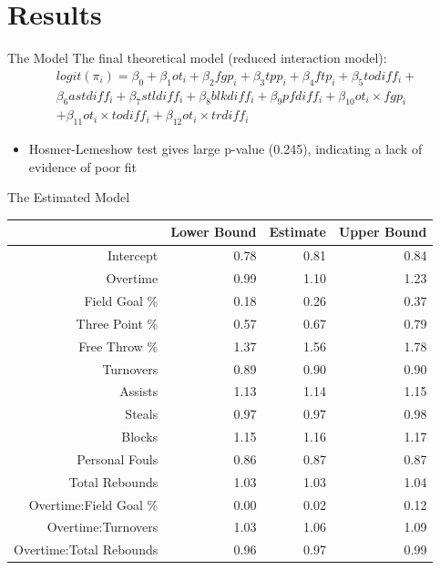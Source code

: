 \documentclass{beamer}
\begin{document}
\section{Results}

	\begin{frame}{The Model}
	The final theoretical model (reduced interaction model): 
	\begin{multline*}
	logit(\pi_{i})=\beta_{0}+\beta_{1}ot_{i}+\beta_{2}fgp_{i}+\beta_{3}tpp_{i}+\beta_{4}ftp_{i}+\beta_{5}todiff_{i}+\\
	\beta_{6}astdiff_{i}+\beta_{7}stldiff_{i}+\beta_{8}blkdiff_{i}+\beta_{9}pfdiff_{i}+\beta_{10}ot_{i}\times fgp_{i}\\
	+\beta_{11}ot_{i}\times todiff_{i}+\beta_{12}ot_{i}\times trdiff_{i}
	\end{multline*}
\begin{itemize}
	\item Hosmer-Lemeshow test gives large p-value (0.245), indicating a lack of evidence of poor fit
\end{itemize}	
\end{frame}	

\begin{frame}{The Estimated Model}
\begin{table}[ht]
	\centering
	\begin{tabular}{rrrr}
		\hline
		& Lower Bound & Estimate & Upper Bound \\ 
		\hline
		Intercept & 0.78 & 0.81 & 0.84 \\ 
		Overtime & 0.99 & 1.10 & 1.23 \\ 
		Field Goal \% & 0.18 & 0.26 & 0.37 \\ 
		Three Point \% & 0.57 & 0.67 & 0.79 \\ 
		Free Throw \% & 1.37 & 1.56 & 1.78 \\ 
		Turnovers & 0.89 & 0.90 & 0.90 \\ 
		Assists & 1.13 & 1.14 & 1.15 \\ 
		Steals & 0.97 & 0.97 & 0.98 \\ 
		Blocks & 1.15 & 1.16 & 1.17 \\ 
		Personal Fouls & 0.86 & 0.87 & 0.87 \\ 
		Total Rebounds & 1.03 & 1.03 & 1.04 \\ 
		Overtime:Field Goal \% & 0.00 & 0.02 & 0.12 \\ 
		Overtime:Turnovers & 1.03 & 1.06 & 1.09 \\ 
		Overtime:Total Rebounds & 0.96 & 0.97 & 0.99 \\ 
		\hline
	\end{tabular}
\end{table}
\end{frame}	
\end{document}
